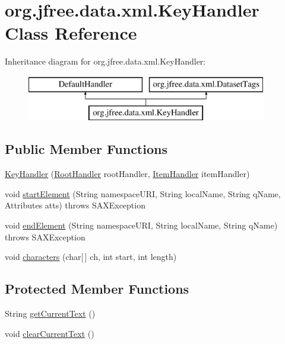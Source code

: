 \hypertarget{classorg_1_1jfree_1_1data_1_1xml_1_1_key_handler}{}\section{org.\+jfree.\+data.\+xml.\+Key\+Handler Class Reference}
\label{classorg_1_1jfree_1_1data_1_1xml_1_1_key_handler}
Inheritance diagram for org.\+jfree.\+data.\+xml.\+Key\+Handler\+:\begin{figure}[H]
\begin{center}
\leavevmode
\includegraphics[height=2.000000cm]{classorg_1_1jfree_1_1data_1_1xml_1_1_key_handler}
\end{center}
\end{figure}
\subsection*{Public Member Functions}
\begin{DoxyCompactItemize}
\item 
\mbox{\hyperlink{classorg_1_1jfree_1_1data_1_1xml_1_1_key_handler_a1a803f1b561bbccc5a9215d934c21aa4}{Key\+Handler}} (\mbox{\hyperlink{classorg_1_1jfree_1_1data_1_1xml_1_1_root_handler}{Root\+Handler}} root\+Handler, \mbox{\hyperlink{classorg_1_1jfree_1_1data_1_1xml_1_1_item_handler}{Item\+Handler}} item\+Handler)
\item 
void \mbox{\hyperlink{classorg_1_1jfree_1_1data_1_1xml_1_1_key_handler_aae89fb7abacca78038c6d449e8fff124}{start\+Element}} (String namespace\+U\+RI, String local\+Name, String q\+Name, Attributes atts)  throws S\+A\+X\+Exception 
\item 
void \mbox{\hyperlink{classorg_1_1jfree_1_1data_1_1xml_1_1_key_handler_a7863a302800bb789c0872a7367019e03}{end\+Element}} (String namespace\+U\+RI, String local\+Name, String q\+Name)  throws S\+A\+X\+Exception 
\item 
void \mbox{\hyperlink{classorg_1_1jfree_1_1data_1_1xml_1_1_key_handler_a0c5470a90a05a88d3cd6961c64881ada}{characters}} (char\mbox{[}$\,$\mbox{]} ch, int start, int length)
\end{DoxyCompactItemize}
\subsection*{Protected Member Functions}
\begin{DoxyCompactItemize}
\item 
String \mbox{\hyperlink{classorg_1_1jfree_1_1data_1_1xml_1_1_key_handler_a7c4b0c513e5459eb2180e175260c6cf8}{get\+Current\+Text}} ()
\item 
void \mbox{\hyperlink{classorg_1_1jfree_1_1data_1_1xml_1_1_key_handler_a3f22c52715ca4fa78afd45fdf406f458}{clear\+Current\+Text}} ()
\end{DoxyCompactItemize}
